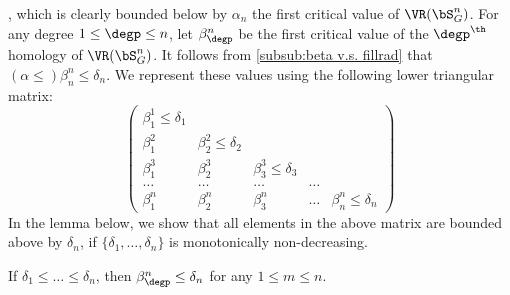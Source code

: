 , which is clearly bounded below by $\alpha_n$ the first critical value of $\VR(\bS^n_G)$.
For any degree $1 \leq \degp \leq n$, let $\beta_{\degp}^{n}$ be the first critical value of the $\degp^\th$ homology of $\VR(\bS^n_G)$.
It follows from \cref{subsub:beta v.s. fillrad} that $(\alpha \leq) \beta_{n}^{n} \leq \delta_n$.
We represent these values using the following lower triangular matrix:
\[
\begin{pmatrix}
	\beta_{1}^{1}\leq \delta_1 & & &&\\
	\beta_1^2 & \beta_{2}^{2} \leq \delta_2 & &&\\
	\beta_1^3 & \beta_{2}^{3} & \beta_{3}^{3} \leq \delta_3 &&\\
	\dots & \dots & \dots & \dots &\\
	\beta_1^n & \beta_2^n & \beta_3^n & \dots & \beta_n^n \leq \delta_n
\end{pmatrix}
\]
In the lemma below, we show that all elements in the above matrix are bounded above by $\delta_n$, if $\{\delta_1, \dots, \delta_n\}$ is monotonically non-decreasing.

\medskip\lemma
If $\delta_1 \leq \dots \leq \delta_n$, then $\beta_{\degp}^{n} \leq \delta_n$ for any $1 \leq m \leq n$.

